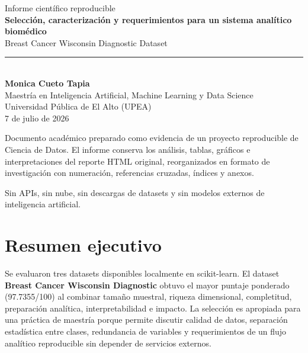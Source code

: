 \documentclass[11pt,a4paper]{article}
\begin{document}
\begin{titlepage}
\thispagestyle{empty}
\pagecolor{Paper}
\begin{center}
\vspace*{1.2cm}
{\Large \textcolor{Accent}{Informe científico reproducible}}\\[1.2cm]
{\Huge \bfseries Selección, caracterización y requerimientos para un sistema analítico biomédico}\\[0.45cm]
{\Large Breast Cancer Wisconsin Diagnostic Dataset}\\[1.6cm]
\rule{0.78\textwidth}{0.6pt}\\[1.2cm]
{\Large \bfseries Monica Cueto Tapia}\\[0.5cm]
{\large Maestría en Inteligencia Artificial, Machine Learning y Data Science}\\[0.25cm]
{\large Universidad Pública de El Alto (UPEA)}\\[1.2cm]
{\large 7 de julio de 2026}\\[2.1cm]
\begin{minipage}{0.78\textwidth}
\small
Documento académico preparado como evidencia de un proyecto reproducible de Ciencia de Datos. El informe conserva los análisis, tablas, gráficos e interpretaciones del reporte HTML original, reorganizados en formato de investigación con numeración, referencias cruzadas, índices y anexos.
\end{minipage}
\vfill
{\small Sin APIs, sin nube, sin descargas de datasets y sin modelos externos de inteligencia artificial.}
\end{center}
\end{titlepage}
\nopagecolor

\tableofcontents
\clearpage
\listoffigures
\clearpage
\listoftables
\clearpage

\section{Resumen ejecutivo}
Se evaluaron tres datasets disponibles localmente en scikit-learn. El dataset \textbf{Breast Cancer Wisconsin Diagnostic} obtuvo el mayor puntaje ponderado (97.7355/100) al combinar tamaño muestral, riqueza dimensional, completitud, preparación analítica, interpretabilidad e impacto. La selección es apropiada para una práctica de maestría porque permite discutir calidad de datos, separación estadística entre clases, redundancia de variables y requerimientos de un flujo analítico reproducible sin depender de servicios externos.
\end{document}
